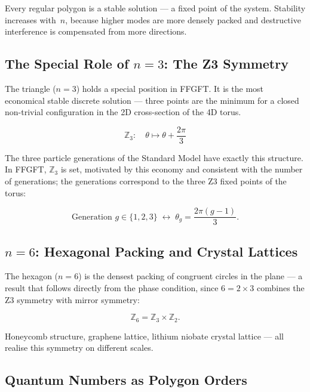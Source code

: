 Every regular polygon is a stable solution — a fixed point of the system.
Stability increases with~$n$, because higher modes are more densely
packed and destructive interference is compensated from more directions.

\subsection{The Special Role of $n = 3$: The Z3 Symmetry}

The triangle ($n=3$) holds a special position in FFGFT. It is
the most economical stable discrete solution — three points are
the minimum for a closed non-trivial configuration in the 2D
cross-section of the 4D torus.

\begin{equation}
  \mathbb{Z}_3: \quad \theta \mapsto \theta + \frac{2\pi}{3}
\end{equation}

The three particle generations of the Standard Model have exactly
this structure. In FFGFT, $\mathbb{Z}_3$ is set, motivated by this
economy and consistent with the number of generations; the generations
correspond to the three Z3 fixed points of the torus:

\begin{equation}
  \text{Generation } g \in \{1, 2, 3\}
  \;\longleftrightarrow\;
  \theta_g = \frac{2\pi(g-1)}{3}.
\end{equation}

\subsection{$n = 6$: Hexagonal Packing and Crystal Lattices}

The hexagon ($n=6$) is the densest packing of congruent circles in
the plane — a result that follows directly from the phase condition,
since $6 = 2 \times 3$ combines the Z3 symmetry with mirror symmetry:

\begin{equation}
  \mathbb{Z}_6 = \mathbb{Z}_3 \times \mathbb{Z}_2.
\end{equation}

Honeycomb structure, graphene lattice, lithium niobate crystal lattice —
all realise this symmetry on different scales.

\subsection{Quantum Numbers as Polygon Orders}

